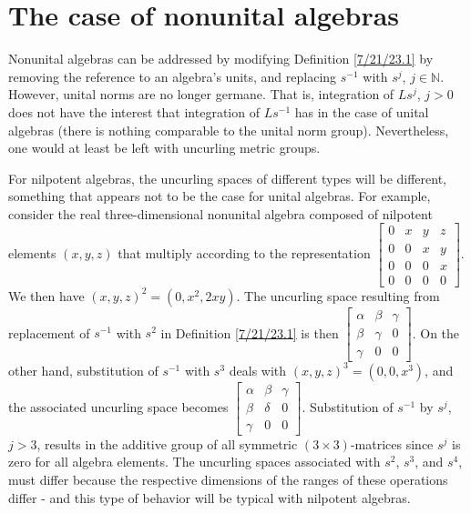 \documentclass{amsart}
\numberwithin{equation}{section}
\theoremstyle{definition}
\numberwithin{theorem}{section}
\begin{document}
\vspace{.75cm} 
 
 \section{The case of nonunital algebras} Nonunital algebras can be addressed by modifying Definition \ref{7/21/23.1} by removing the reference to an algebra's units, and replacing $s^{-1}$ with $s^j$, $j \in \mathbb{N}$.   However, unital norms are no longer germane.  That is, integration of $Ls^j$, $j>0$ does not have the interest that integration of $Ls^{-1}$ has in the case of unital algebras (there is nothing comparable to the unital norm group).  Nevertheless, one would at least be left with uncurling metric groups.

For nilpotent algebras, the uncurling spaces of different types will be different, something that appears not to be the case for unital algebras.  For example, consider the real three-dimensional nonunital algebra composed of nilpotent elements $(x,y,z)$ that multiply according to the representation
  $ \left[
\begin{array}{ccccc}
0 & x & y & z  \\
0 & 0 & x & y \\
0 & 0 & 0 & x \\
0 & 0 & 0 & 0
\end{array}
\right] $.  We then have $(x,y,z)^2 = (0,x^2, 2xy)$.  The uncurling space resulting from replacement of $s^{-1}$ with  $s^2$ in Definition \ref{7/21/23.1} is then $\left[
\begin{array}{ccccc}
\alpha & \beta & \gamma   \\
\beta & \gamma & 0 \\
\gamma & 0 & 0  
\end{array}
\right] $.  On the other hand, substitution of $s^{-1}$ with $s^3$  deals with $(x,y,z)^3 = (0,0, x^3)$, and the associated uncurling space becomes $\left[
\begin{array}{ccccc}
\alpha & \beta & \gamma   \\
\beta & \delta & 0 \\
\gamma & 0 & 0  
\end{array}
\right] $.  Substitution of $s^{-1}$ by $s^j$, $j>3$, results in the additive group of all symmetric $(3\times 3)$-matrices since $s^j$ is zero for all algebra elements.  The uncurling spaces associated with $s^2$, $s^3$, and $s^4$, must differ because the respective dimensions of the ranges of these operations differ - and this type of behavior will be typical with nilpotent algebras.  
 
\end{document}
